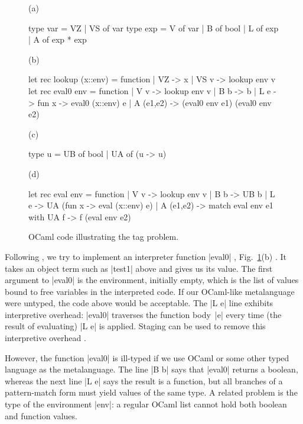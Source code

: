 \begin{figure}
%
(a) \begin{code2}
type var = VZ | VS of var
type exp = V of var | B of bool | L of exp | A of exp * exp
\end{code2}

(b) \begin{code2}
let rec lookup (x::env) = function | VZ   -> x
                                   | VS v -> lookup env v
let rec eval0 env = function
| V v       -> lookup env v
| B b       -> b 
| L e       -> fun x -> eval0 (x::env) e
| A (e1,e2) -> (eval0 env e1) (eval0 env e2) 
\end{code2}

(c) \begin{code2}
type u = UB of bool | UA of (u -> u)
\end{code2}

(d) \begin{code2}
let rec eval env = function
| V v       -> lookup env v
| B b       -> UB b
| L e       -> UA (fun x -> eval (x::env) e)
| A (e1,e2) -> match eval env e1 with UA f -> f (eval env e2)
\end{code2}
\caption{OCaml code illustrating the tag problem.}
\label{fig:tag-problem}
\end{figure}
% 
Following \cite{WalidICFP02},
we try to implement an interpreter function |eval0|%
, Fig.~\ref{fig:tag-problem}(b)%
. It takes
an object term such as |test1| above and gives us its value.
The first argument to |eval0| is the environment, initially empty,
which is the list of values bound to free variables in the
interpreted code.
If our OCaml-like metalanguage were untyped, the code above would be 
acceptable.
The |L e| line exhibits interpretive overhead:
|eval0| traverses the function body~|e| every time (the result of
evaluating) |L e| is applied. Staging can be used to remove this
interpretive overhead \citep[\S1.1--2]{WalidICFP02}.

However, the function |eval0| is ill-typed
if we use OCaml or some other typed language as the metalanguage.
The line |B b|
says that |eval0| returns a boolean, whereas the next line |L e| says
the result is a function, but all branches of a pattern-match form must
yield values of the same type. 
A related problem is the type of the environment |env|: a regular
OCaml list cannot hold both boolean and function values. 

